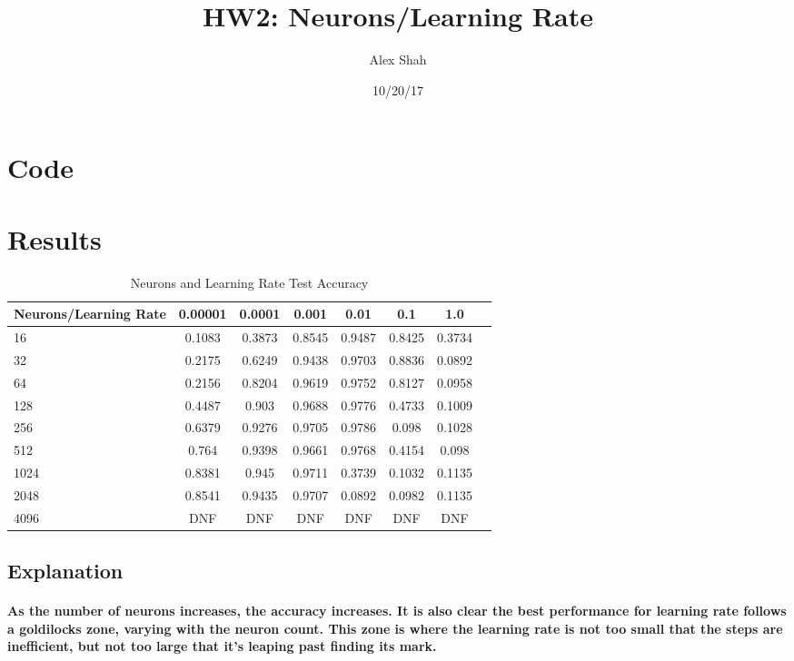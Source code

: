 \documentclass[10pt,a4paper]{report}
\title{HW2: Neurons/Learning Rate}
\author{Alex Shah}
\date{10/20/17}
\begin{document}
\lstset{language=Python}
\maketitle

\section{Code}



\clearpage

\section{Results}

\begin{table}[h]
 \caption{Neurons and Learning Rate Test Accuracy}
 \label{tbl:aTable}
 \begin{center}
  \begin{tabular}{lccccccr}
    \hline 
    Neurons/Learning Rate & 0.00001 & 0.0001 & 0.001 & 0.01 & 0.1 & 1.0  \\
    \hline
    16 & 0.1083 & 0.3873 & 0.8545 & 0.9487 & 0.8425 & 0.3734 \\
    32 & 0.2175 & 0.6249 & 0.9438 & 0.9703 & 0.8836 & 0.0892 \\
    64 & 0.2156 & 0.8204 & 0.9619 & 0.9752 & 0.8127 & 0.0958 \\
    128 & 0.4487 & 0.903 & 0.9688 & 0.9776 & 0.4733 & 0.1009 \\
    256 & 0.6379 & 0.9276 & 0.9705 & 0.9786 & 0.098 & 0.1028 \\
    512 & 0.764 & 0.9398 & 0.9661 & 0.9768 & 0.4154 & 0.098 \\
    1024 & 0.8381 & 0.945 & 0.9711 & 0.3739 & 0.1032 & 0.1135 \\
    2048 & 0.8541 & 0.9435 & 0.9707 & 0.0892 & 0.0982 & 0.1135 \\
    4096 & DNF & DNF & DNF & DNF & DNF & DNF \\
    \hline 
  \end{tabular}
 \end{center}
\end{table}

\subsection{Explanation}

\paragraph{
As the number of neurons increases, the accuracy increases. It is also clear the best performance for learning rate follows a goldilocks zone, varying with the neuron count. This zone is where the learning rate is not too small that the steps are inefficient, but not too large that it's leaping past finding its mark. 
}
\end{document}
